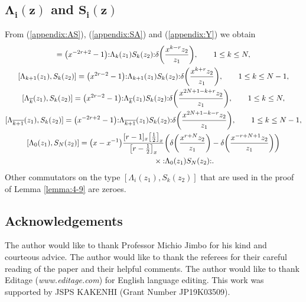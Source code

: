 \documentclass[pdftex]{sigma}
\numberwithin{equation}{section}
\begin{document}
\subsection[\protect{$Lambda\_\{i\}(z)$} and \protect{$S\_\{i\}(z)$}]
{$\boldsymbol{\Lambda_i(z)}$ and $\boldsymbol {S_i(z)}$}
From (\ref{appendix:AS}), (\ref{appendix:SA}) and (\ref{appendix:Y}) we obtain
\begin{gather}
[\Lambda_k(z_1),S_k(z_2)]=\big(x^{-2r+2}-1\big){:}\Lambda_k(z_1)S_k(z_2){:}
\delta\bigg(\frac{x^{k-r}z_2}{z_1}\bigg),\qquad
1\leq k \leq N,\nonumber
\\
[\Lambda_{k+1}(z_1),S_k(z_2)]=\big(x^{2r-2}-1\big){:}\Lambda_{k+1}(z_1)S_k(z_2){:}
\delta\bigg(\frac{x^{k+r}z_2}{z_1}\bigg),\qquad
1\leq k \leq N-1,\nonumber
\\
[\Lambda_{\overline{k}}(z_1),S_k(z_2)]=\big(x^{2r-2}-1\big)
{:}\Lambda_{\overline{k}}(z_1)S_k(z_2){:}
\delta\bigg(\frac{x^{2N+1-k+r}z_2}{z_1}\bigg),\qquad 1\leq k \leq N,
\nonumber
\\
[\Lambda_{\overline{k+1}}(z_1),S_k(z_2)]=\big(x^{-2r+2}-1\big)
{:}\Lambda_{\overline{k+1}}(z_1)S_k(z_2){:}
\delta\bigg(\frac{x^{{2N+1-k-r}}z_2}{z_1}\bigg),\qquad
1\leq k \leq N-1,\nonumber
\\
[\Lambda_0(z_1),S_N(z_2)]={\big(x-x^{-1}\big)}
\frac{[r-1]_x\big[\frac{1}{2}\big]_x}{\big[r-\frac{1}{2}\big]_x}
\bigg(\delta\bigg(\frac{x^{r+N}z_2}{z_1}\bigg)
-\delta\bigg(\frac{x^{-r+N+1}z_2}{z_1}\bigg)\bigg)\nonumber
\\ \hphantom{[\Lambda_0(z_1),S_N(z_2)]=}
{}\times{:}\Lambda_0(z_1)S_N(z_2){:}.
\label{exchange:Lambda-S}
\end{gather}
Other commutators on the type $[\Lambda_i(z_1), S_k(z_2)]$
that are used in the proof of Lemma \ref{lemma:4-9} are zeroes.

\subsection*{Acknowledgements}

The author would like to thank Professor Michio Jimbo
for his kind and courteous advice.
The author would like to thank the referees
for their careful reading of the paper and their helpful comments.
The author would like to thank Editage ({\it www.editage.com}) for English language editing.
This work was supported by
JSPS KAKENHI (Grant Number JP19K03509).

%
%
\end{document}
